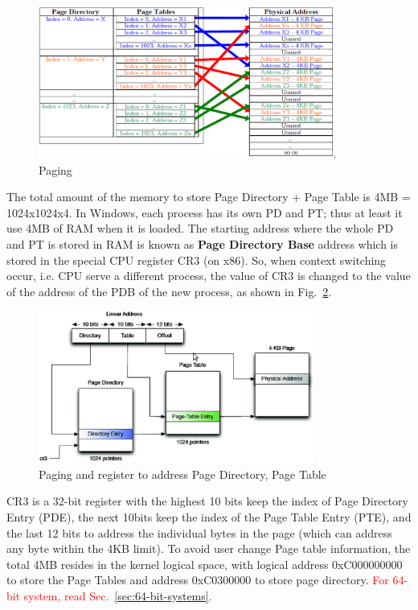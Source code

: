 \begin{figure}[hbt]
  \centerline{\includegraphics[height=5cm,
    angle=0]{./images/paging.eps}}
\caption{Paging}
\label{fig:paging}
\end{figure}

The total amount of the memory to store Page Directory + Page Table is
4MB = 1024x1024x4. In Windows, each process has its own PD and PT;
thus at least it use 4MB of RAM when it is loaded. The starting
address where the whole PD and PT is stored in RAM is known as
{\bf Page Directory Base} address which is stored in the special CPU
register CR3 (on x86). So, when context switching occur, i.e. CPU
serve a different process, the value of CR3 is changed to the value of
the address of the PDB of the new process, as shown in
Fig.~\ref{fig:paging_register}.
\begin{figure}[hbt]
  \centerline{\includegraphics[height=5cm,
    angle=0]{./images/paging_register.eps}}
\caption{Paging and register to address Page Directory, Page Table}
\label{fig:paging_register}
\end{figure}
CR3 is a 32-bit register with the highest 10 bits keep the index of
Page Directory Entry (PDE), the next 10bits keep the index of the Page
Table Entry (PTE), and the last 12 bits to address the individual
bytes in the page (which can address any byte within the 4KB
limit). To avoid user change Page table information, the total 4MB
resides in the kernel logical space, with logical address 0xC000000000
to store the Page Tables and address 0xC0300000 to store page
directory. \textcolor{red}{For 64-bit system, read
  Sec.~\ref{sec:64-bit-systems}.}


